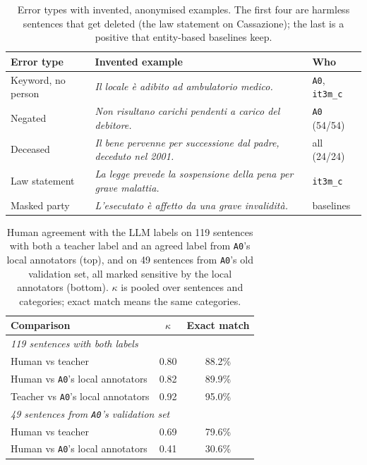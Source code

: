 \documentclass[11pt]{article}
\begin{document}
\begin{table}[t]
\centering\footnotesize
\setlength{\tabcolsep}{3pt}
\begin{tabular}{lp{}l}
\toprule
Error type & Invented example & Who \\
\midrule
Keyword, no person & \emph{Il locale \`e adibito ad ambulatorio medico.} & \texttt{A0}, \texttt{it3m\_c} \\
Negated & \emph{Non risultano carichi pendenti a carico del debitore.} & \texttt{A0} (54/54) \\
Deceased & \emph{Il bene pervenne per successione dal padre, deceduto nel 2001.} & all (24/24) \\
Law statement & \emph{La legge prevede la sospensione della pena per grave malattia.} & \texttt{it3m\_c} \\
Masked party & \emph{L'esecutato \`e affetto da una grave invalidit\`a.} & baselines \\
\bottomrule
\end{tabular}
\caption{Error types with invented, anonymised examples. The first four are harmless sentences that get deleted (the law statement on Cassazione); the last is a positive that entity-based baselines keep.}
\label{tab:errors}
\end{table}

\begin{table}[t]
\centering\footnotesize
\begin{tabular}{lcc}
\toprule
Comparison & $\kappa$ & Exact match \\
\midrule
\multicolumn{3}{l}{\emph{119 sentences with both labels}} \\
Human vs teacher & 0.80 & 88.2\% \\
Human vs \texttt{A0}'s local annotators & 0.82 & 89.9\% \\
Teacher vs \texttt{A0}'s local annotators & 0.92 & 95.0\% \\
\midrule
\multicolumn{3}{l}{\emph{49 sentences from \texttt{A0}'s validation set}} \\
Human vs teacher & 0.69 & 79.6\% \\
Human vs \texttt{A0}'s local annotators & 0.41 & 30.6\% \\
\bottomrule
\end{tabular}
\caption{Human agreement with the LLM labels on 119 sentences with both a teacher label and an agreed label from \texttt{A0}'s local annotators (top), and on 49 sentences from \texttt{A0}'s old validation set, all marked sensitive by the local annotators (bottom). $\kappa$ is pooled over sentences and categories; exact match means the same categories.}
\label{tab:human}
\end{table}
\end{document}
